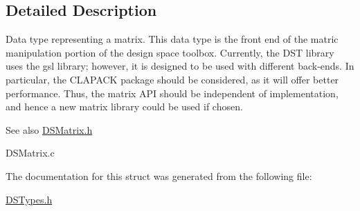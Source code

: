 \subsection{Detailed Description}
Data type representing a matrix. This data type is the front end of the matric manipulation portion of the design space toolbox. Currently, the DST library uses the gsl library; however, it is designed to be used with different back-\/ends. In particular, the CLAPACK package should be considered, as it will offer better performance. Thus, the matrix API should be independent of implementation, and hence a new matrix library could be used if chosen.

\begin{DoxySeeAlso}{See also}
\hyperlink{_d_s_matrix_8h}{DSMatrix.h} 

DSMatrix.c 
\end{DoxySeeAlso}


The documentation for this struct was generated from the following file:\begin{DoxyCompactItemize}
\item 
\hyperlink{_d_s_types_8h}{DSTypes.h}\end{DoxyCompactItemize}
